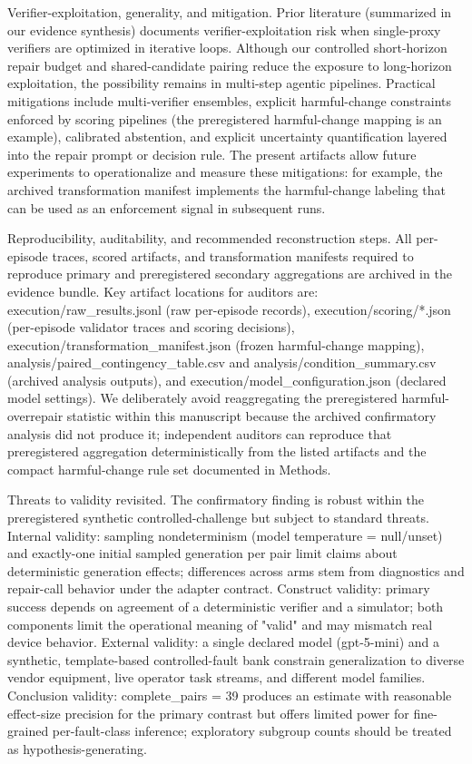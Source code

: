 \documentclass[conference]{IEEEtran}
\begin{document}
Verifier-exploitation, generality, and mitigation. Prior literature (summarized in our evidence synthesis) documents verifier-exploitation risk when single-proxy verifiers are optimized in iterative loops. Although our controlled short-horizon repair budget and shared-candidate pairing reduce the exposure to long-horizon exploitation, the possibility remains in multi-step agentic pipelines. Practical mitigations include multi-verifier ensembles, explicit harmful-change constraints enforced by scoring pipelines (the preregistered harmful-change mapping is an example), calibrated abstention, and explicit uncertainty quantification layered into the repair prompt or decision rule. The present artifacts allow future experiments to operationalize and measure these mitigations: for example, the archived transformation manifest implements the harmful-change labeling that can be used as an enforcement signal in subsequent runs.

Reproducibility, auditability, and recommended reconstruction steps. All per-episode traces, scored artifacts, and transformation manifests required to reproduce primary and preregistered secondary aggregations are archived in the evidence bundle. Key artifact locations for auditors are: execution/raw\_results.jsonl (raw per-episode records), execution/scoring/*.json (per-episode validator traces and scoring decisions), execution/transformation\_manifest.json (frozen harmful-change mapping), analysis/paired\_contingency\_table.csv and analysis/condition\_summary.csv (archived analysis outputs), and execution/model\_configuration.json (declared model settings). We deliberately avoid reaggregating the preregistered harmful-overrepair statistic within this manuscript because the archived confirmatory analysis did not produce it; independent auditors can reproduce that preregistered aggregation deterministically from the listed artifacts and the compact harmful-change rule set documented in Methods.

Threats to validity revisited. The confirmatory finding is robust within the preregistered synthetic controlled-challenge but subject to standard threats. Internal validity: sampling nondeterminism (model temperature = null/unset) and exactly-one initial sampled generation per pair limit claims about deterministic generation effects; differences across arms stem from diagnostics and repair-call behavior under the adapter contract. Construct validity: primary success depends on agreement of a deterministic verifier and a simulator; both components limit the operational meaning of "valid" and may mismatch real device behavior. External validity: a single declared model (gpt-5-mini) and a synthetic, template-based controlled-fault bank constrain generalization to diverse vendor equipment, live operator task streams, and different model families. Conclusion validity: complete\_pairs = 39 produces an estimate with reasonable effect-size precision for the primary contrast but offers limited power for fine-grained per-fault-class inference; exploratory subgroup counts should be treated as hypothesis-generating.
\end{document}
